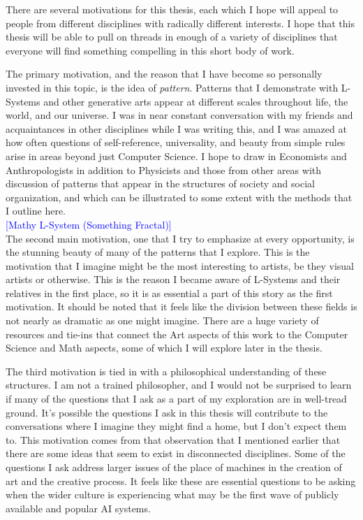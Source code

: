 \documentclass[12pt,twoside]{reedthesis}
\begin{document}
There are several motivations for this thesis, each which I hope will appeal to people from different disciplines with radically different interests. I hope that this thesis will be able to pull on threads in enough of a variety of disciplines that everyone will find something compelling in this short body of work.

	The primary motivation, and the reason that I have become so personally invested in this topic, is the idea of \textit{pattern}. Patterns that I demonstrate with L-Systems and other generative arts appear at different scales throughout life, the world, and our universe. I was in near constant conversation with my friends and acquaintances in other disciplines while I was writing this, and I was amazed at how often questions of self-reference, universality, and beauty from simple rules arise in areas beyond just Computer Science. I hope to draw in Economists and Anthropologists in addition to Physicists and those from other areas with discussion of patterns that appear in the structures of society and social organization, and which can be illustrated to some extent with the methods that I outline here.\\

\textcolor{blue}{[Mathy L-System (Something Fractal)]}\\

	The second main motivation, one that I try to emphasize at every opportunity, is the stunning beauty of many of the patterns that I explore. This is the motivation that I imagine might be the most interesting to artists, be they visual artists or otherwise. This is the reason I became aware of L-Systems and their relatives in the first place, so it is as essential a part of this story as the first motivation. It should be noted that it feels like the division between these fields is not nearly as dramatic as one might imagine. There are a huge variety of resources and tie-ins that connect the Art aspects of this work to the Computer Science and Math aspects, some of which I will explore later in the thesis. 
	
	The third motivation is tied in with a philosophical understanding of these structures. I am not a trained philosopher, and I would not be surprised to learn if many of the questions that I ask as a part of my exploration are in well-tread ground. It’s possible the questions I ask in this thesis will contribute to the conversations where I imagine they might find a home, but I don't expect them to. This motivation comes from that observation that I mentioned earlier that there are some ideas that seem to exist in disconnected disciplines. Some of the questions I ask address larger issues of the place of machines in the creation of art and the creative process. It feels like these are essential questions to be asking when the wider culture is experiencing what may be the first wave of publicly available and popular AI systems.\\
	
\end{document}
